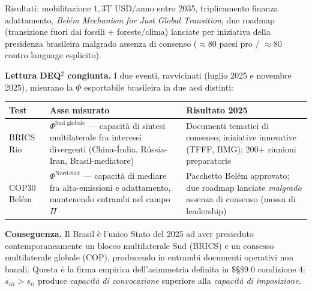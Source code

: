 Risultati: mobilitazione \(1{,}3\)T USD/anno entro 2035, triplicamento
finanza adattamento, \emph{Belém Mechanism for Just Global Transition},
due roadmap (transizione fuori dai fossili + foreste/clima) lanciate per
iniziativa della presidenza brasileira malgrado assenza di consenso
(\(\approx 80\) paesi pro / \(\approx 80\) contro language esplicito).

\Hypoth{} \textbf{Lettura DEQ$^2$ congiunta.} I due eventi, ravvicinati
(luglio 2025 e novembre 2025), misurano la \(\Phi\) esportabile
brasileira in due assi distinti:

{\def\LTcaptype{none} %
{\small\begin{longtable}[]{@{}
  >{\raggedright\arraybackslash}p{}
  >{\raggedright\arraybackslash}p{}
  >{\raggedright\arraybackslash}p{}@{}}
\toprule\noalign{}
\begin{minipage}[b]{\linewidth}\raggedright
Test
\end{minipage} & \begin{minipage}[b]{\linewidth}\raggedright
Asse misurato
\end{minipage} & \begin{minipage}[b]{\linewidth}\raggedright
Risultato 2025
\end{minipage} \\
\midrule\noalign{}
\endhead
\bottomrule\noalign{}
\endlastfoot
BRICS Rio & \(\Phi^{\text{Sud globale}}\) --- capacità di sintesi
multilaterale fra interessi divergenti (China-Índia, Rússia-Iran,
Brasil-mediatore) & Documenti tematici di consenso; iniziative
innovative (TFFF, BMG); 200+ riunioni preparatorie \\
COP30 Belém & \(\Phi^{\text{Nord-Sud}}\) --- capacità di mediare fra
alta-emissioni e adattamento, mantenendo entrambi nel campo \(\Pi\) &
Pacchetto Belém approvato; due roadmap lanciate \emph{malgrado} assenza
di consenso (mossa di leadership) \\
\end{longtable}}
}

\Proved{} \textbf{Conseguenza.} Il Brasil è l'unico Stato del 2025 ad
aver presieduto contemporaneamente un blocco multilaterale Sud (BRICS) e
un consesso multilaterale globale (COP), producendo in entrambi
documenti operativi non banali. Questa è la firma empirica
dell'asimmetria definita in \$\S\$9.0 condizione 4: \(s_{iii} > s_{ii}\)
produce \emph{capacità di convocazione} superiore alla \emph{capacità di
imposizione}.


